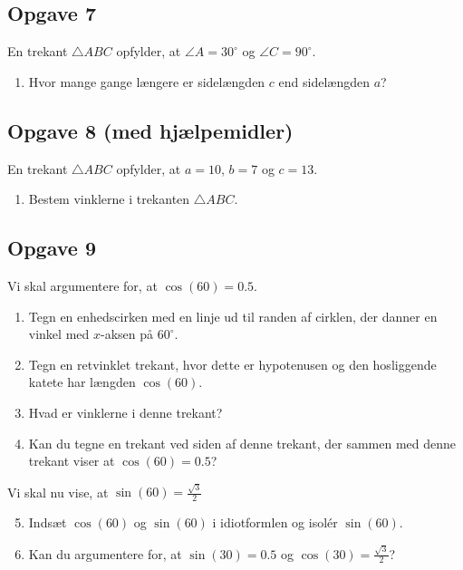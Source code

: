 \subsection*{Opgave 7}
En trekant $\triangle ABC$ opfylder, at $\angle A = 30^\circ$ og $\angle C = 90^\circ$. 
\begin{enumerate}[label=\roman*)]
	\item Hvor mange gange længere er sidelængden $c$ end sidelængden $a$?
\end{enumerate}

\subsection*{Opgave 8 (med hjælpemidler)}
En trekant $\triangle ABC$ opfylder, at $a = 10$, $b = 7$ og $c = 13$. 
\begin{enumerate}[label=\roman*)]
	\item Bestem vinklerne i trekanten $\triangle ABC$. 
\end{enumerate}

\subsection*{Opgave 9}
Vi skal argumentere for, at $\cos(60) = 0.5$. 
\begin{enumerate}[label=\roman*)]
	\item Tegn en enhedscirken med en linje ud til randen af cirklen,
	 der danner en vinkel med $x$-aksen på $60^\circ$.
	\item Tegn en retvinklet trekant, hvor dette er hypotenusen og
	 den hosliggende katete har længden $\cos(60)$.
	\item Hvad er vinklerne i denne trekant?
	\item Kan du tegne en trekant ved siden af denne trekant, der sammen med denne trekant
	 viser at $\cos(60) = 0.5$?
\end{enumerate}
Vi skal nu vise, at $\sin(60) = \frac{\sqrt{3}}{2}$
\begin{enumerate}[label=\roman*)]
	\setcounter{enumi}{4}
\item Indsæt $\cos(60)$ og $\sin(60)$ i idiotformlen og isolér $\sin(60)$. 
\item Kan du argumentere for, at $\sin(30) = 0.5$ og $\cos(30) = \frac{\sqrt{3}}{2}$?
\end{enumerate}
